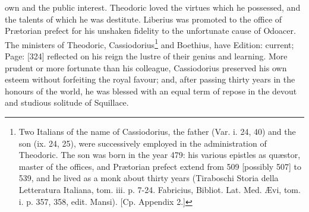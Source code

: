 own and the public interest. Theodoric loved the virtues which he possessed, and the talents of which he was destitute. Liberius was promoted to the office of Prætorian prefect for his unshaken fidelity to the unfortunate cause of Odoacer. The ministers of Theodoric, Cassiodorius\footnote{Two Italians of the name of Cassiodorius, the father (Var. i. 24, 40) and the son (ix. 24, 25), were successively employed in the administration of Theodoric. The son was born in the year 479: his various epistles as quæstor, master of the offices, and Prætorian prefect extend from 509 [possibly 507] to 539, and he lived as a monk about thirty years (Tiraboschi Storia della Letteratura Italiana, tom. iii. p. 7-24. Fabricius, Bibliot. Lat. Med. Ævi, tom. i. p. 357, 358, edit. Mansi). [Cp. Appendix 2.]} and Boethius, have Edition: current; Page: [324] reflected on his reign the lustre of their genius and learning. More prudent or more fortunate than his colleague, Cassiodorius preserved his own esteem without forfeiting the royal favour; and, after passing thirty years in the honours of the world, he was blessed with an equal term of repose in the devout and studious solitude of Squillace.

